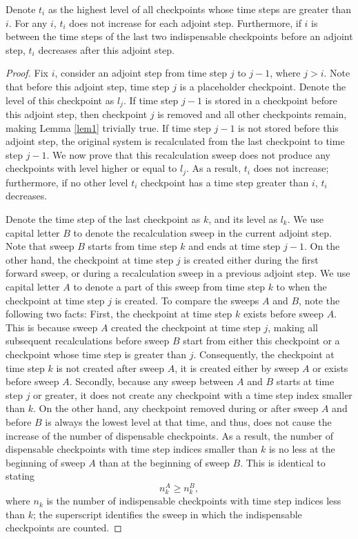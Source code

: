 \documentclass[oneeqnum, onethmnum, onefignum, onetabnum]{siamltex}
\begin{document}
\begin{lemma} \label{lem1}
    Denote $t_i$ as the highest level of all checkpoints whose time steps
    are greater than $i$.  For any $i$, $t_i$ does not increase for each
    adjoint step.  Furthermore, if $i$ is between the time steps of the last
    two indispensable checkpoints before an adjoint step, $t_i$ decreases
    after this adjoint step.
\end{lemma}
\begin{proof}
    Fix $i$, consider an adjoint step from time step $j$ to $j - 1$, where
    $j > i$.  Note that before this adjoint step, time step $j$ is a
    placeholder checkpoint.  Denote the level of this checkpoint as $l_j$.
    If time step $j - 1$ is stored in a checkpoint before this adjoint
    step, then checkpoint $j$ is removed and all other checkpoints remain,
    making Lemma \ref{lem1} trivially true.  If time step $j - 1$ is not stored
    before this adjoint step, the original system is recalculated from
    the last checkpoint to time step $j - 1$.  We now prove that this
    recalculation sweep does not produce any checkpoints with level higher or
    equal to $l_j$.  As a result, $t_i$ does not increase; furthermore, if
    no other level $t_i$ checkpoint has a time step greater than $i$, $t_i$
    decreases.

    Denote the time step of the last checkpoint as $k$, and its level as $l_k$.
    We use capital letter $B$ to denote the recalculation sweep in the current
    adjoint step.  Note that sweep $B$ starts from time step $k$ and ends at
    time step $j - 1$.  On the other hand, the checkpoint at time step $j$ is
    created either during the first forward sweep, or during a recalculation
    sweep in a previous adjoint step.  We use capital letter $A$ to denote a
    part of this sweep from time step $k$ to when the checkpoint at time step
    $j$ is created.  To compare the sweeps $A$ and $B$, note the following
    two facts:
    First, the checkpoint at time step $k$ exists before sweep $A$.  This is
    because sweep $A$ created the checkpoint at time step $j$, making all
    subsequent recalculations before sweep $B$ start from either this
    checkpoint or a checkpoint whose time step is greater than $j$.
    Consequently, the checkpoint at time step $k$ is not created after sweep
    $A$, it is created either by sweep $A$ or exists before sweep $A$.
    Secondly, because any sweep between $A$ and $B$ starts at time step $j$
    or greater, it does not create any checkpoint with a time step index smaller
    than $k$.  On the other hand, any checkpoint removed during or after sweep
    $A$ and before $B$ is always the lowest level at that time, and thus, does
    not cause the increase of the number of dispensable checkpoints.  As a
    result, the number of dispensable checkpoints with time step indices smaller
    than $k$ is no less at the beginning of sweep $A$ than at the beginning of
    sweep $B$.  This is identical to stating
    $$ n_k^{A} \ge n_k^{B}, $$
    where $n_k$ is the number of indispensable checkpoints with time step
    indices less than $k$; the superscript identifies the sweep in which the
    indispensable checkpoints are counted.


\end{proof}
\end{document}
